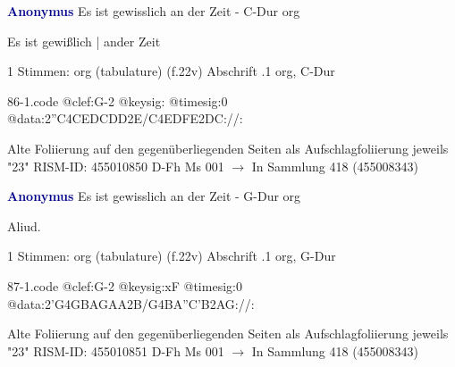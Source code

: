 \documentclass[twocolumn]{book}
\begin{document}
\newline \par \vspace{7pt} \textcolor{darkblue}{\textbf{Anonymus  }}
\newline Es ist gewisslich an der Zeit - C-Dur
\newline org
\newline \begin{itshape}[f.22v, at left:] Es ist gewißlich | ander Zeit\end{itshape} 
\newline \textcolor{darkblue}{}  1 Stimmen: org (tabulature)  (f.22v)
\newline Abschrift
.1  org, C-Dur  
\begin{filecontents*}{86-1.code}
@clef:G-2
@keysig:
@timesig:0
@data:2''C4CEDCDD2E/C4EDFE2DC://:
\end{filecontents*}
\newline
%
\newline Alte Foliierung auf den gegenüberliegenden Seiten als Aufschlagfoliierung jeweils "23"
\newline RISM-ID: 455010850
\newline D-Fh  Ms 001
\newline $\rightarrow$ In Sammlung 418 (455008343)
      
\newline \par \vspace{7pt} \textcolor{darkblue}{\textbf{Anonymus  }}
\newline Es ist gewisslich an der Zeit - G-Dur
\newline org
\newline \begin{itshape}[f.22v, at left:] Aliud.\end{itshape} 
\newline \textcolor{darkblue}{}  1 Stimmen: org (tabulature)  (f.22v)
\newline Abschrift
.1  org, G-Dur  
\begin{filecontents*}{87-1.code}
@clef:G-2
@keysig:xF
@timesig:0
@data:2'G4GBAGAA2B/G4BA''C'B2AG://:
\end{filecontents*}
\newline
%
\newline Alte Foliierung auf den gegenüberliegenden Seiten als Aufschlagfoliierung jeweils "23"
\newline RISM-ID: 455010851
\newline D-Fh  Ms 001
\newline $\rightarrow$ In Sammlung 418 (455008343)
      
\end{document}
